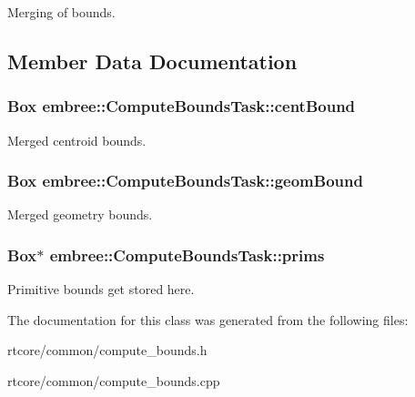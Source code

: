 Merging of bounds. 



\subsection{Member Data Documentation}
\hypertarget{classembree_1_1_compute_bounds_task_a7b7eb44229e94eeb13c587eb6153d3d5}{
\subsubsection[{centBound}]{\setlength{\rightskip}{0pt plus 5cm}Box {\bf embree::ComputeBoundsTask::centBound}}}
\label{classembree_1_1_compute_bounds_task_a7b7eb44229e94eeb13c587eb6153d3d5}


Merged centroid bounds. 

\hypertarget{classembree_1_1_compute_bounds_task_a9d9691967473a2fb5317bd1f4d8c442d}{
\subsubsection[{geomBound}]{\setlength{\rightskip}{0pt plus 5cm}Box {\bf embree::ComputeBoundsTask::geomBound}}}
\label{classembree_1_1_compute_bounds_task_a9d9691967473a2fb5317bd1f4d8c442d}


Merged geometry bounds. 

\hypertarget{classembree_1_1_compute_bounds_task_aae812d1cb3a99694619bb1fdab6f5fee}{
\subsubsection[{prims}]{\setlength{\rightskip}{0pt plus 5cm}Box$\ast$ {\bf embree::ComputeBoundsTask::prims}}}
\label{classembree_1_1_compute_bounds_task_aae812d1cb3a99694619bb1fdab6f5fee}


Primitive bounds get stored here. 



The documentation for this class was generated from the following files:\begin{DoxyCompactItemize}
\item 
rtcore/common/compute\_\-bounds.h\item 
rtcore/common/compute\_\-bounds.cpp\end{DoxyCompactItemize}
